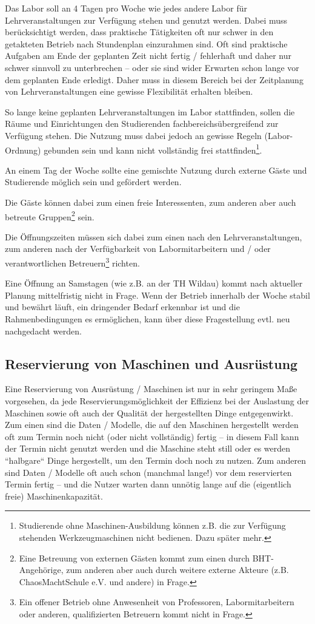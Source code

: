 \documentclass[parskip=half,headsepline,footsepline,titlepage]{scrartcl}
\begin{document}
Das Labor soll an 4 Tagen pro Woche wie jedes andere Labor für Lehrveranstaltungen zur Verfügung stehen und genutzt werden. Dabei muss berücksichtigt werden, dass praktische Tätigkeiten oft nur schwer in den getakteten Betrieb nach Stundenplan einzurahmen sind. Oft sind praktische Aufgaben am Ende der geplanten Zeit nicht fertig / fehlerhaft und daher nur schwer sinnvoll zu unterbrechen -- oder sie sind wider Erwarten schon lange vor dem geplanten Ende erledigt. Daher muss in diesem Bereich bei der Zeitplanung von Lehrveranstaltungen eine gewisse Flexibilität erhalten bleiben.

So lange keine geplanten Lehrveranstaltungen im Labor stattfinden, sollen die Räume und Einrichtungen den Studierenden fachbereichsübergreifend zur Verfügung stehen. Die Nutzung muss dabei jedoch an gewisse Regeln (Labor-Ordnung) gebunden sein und kann nicht vollständig frei stattfinden\footnote{Studierende ohne Maschinen-Ausbildung können z.B. die zur Verfügung stehenden Werkzeugmaschinen nicht bedienen. Dazu später mehr.}.

An einem Tag der Woche sollte eine gemischte Nutzung durch externe Gäste und Studierende möglich sein und gefördert werden.

Die Gäste können dabei zum einen freie Interessenten, zum anderen aber auch betreute Gruppen\footnote{Eine Betreuung von externen Gästen kommt zum einen durch BHT-Angehörige, zum anderen aber auch durch weitere externe Akteure (z.B. ChaosMachtSchule e.V. und andere) in Frage.} sein.

Die Öffnungszeiten müssen sich dabei zum einen nach den Lehrveranstaltungen, zum anderen nach der Verfügbarkeit von Labormitarbeitern und / oder verantwortlichen Betreuern\footnote{Ein offener Betrieb ohne Anwesenheit von Professoren, Labormitarbeitern oder anderen, qualifizierten Betreuern kommt nicht in Frage.} richten.

Eine Öffnung an Samstagen (wie z.B. an der TH Wildau) kommt nach aktueller Planung mittelfristig nicht in Frage. Wenn der Betrieb innerhalb der Woche stabil und bewährt läuft, ein dringender Bedarf erkennbar ist und die Rahmenbedingungen es ermöglichen, kann über diese Fragestellung evtl. neu nachgedacht werden.

\subsection{Reservierung von Maschinen und Ausrüstung}
Eine Reservierung von Ausrüstung / Maschinen ist nur in sehr geringem Maße vorgesehen, da jede Reservierungsmöglichkeit der Effizienz bei der Auslastung der Maschinen sowie oft auch der Qualität der hergestellten Dinge entgegenwirkt. 
Zum einen sind die Daten / Modelle, die auf den Maschinen hergestellt werden oft zum Termin noch nicht (oder nicht vollständig) fertig -- in diesem Fall kann der Termin nicht genutzt werden und die Maschine steht still oder es werden ``halbgare`` Dinge hergestellt, um den Termin doch noch zu nutzen.
Zum anderen sind Daten / Modelle oft auch schon (manchmal lange!) vor dem reservierten Termin fertig -- und die Nutzer warten dann unnötig lange auf die (eigentlich freie) Maschinenkapazität.
\end{document}

